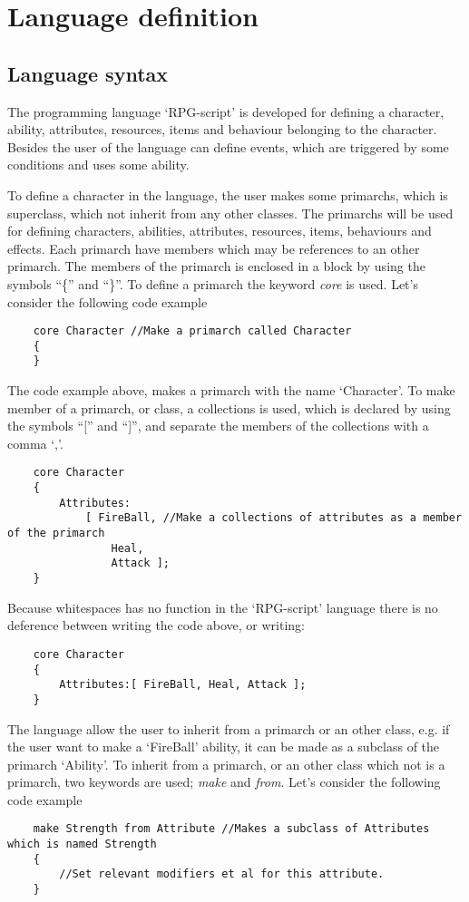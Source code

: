 \chapter{Language definition}
\section{Language syntax}

The programming language `RPG-script' is developed for defining a character, ability, attributes, resources, items and behaviour belonging to the character. Besides the user of the language can define events, which are triggered by some conditions and uses some ability.

To define a character in the language, the user makes some primarchs, which is superclass, which not inherit from any other classes. The primarchs will be used for defining characters, abilities, attributes, resources, items, behaviours and effects.
Each primarch have members which may be references to an other primarch. The members of the primarch is enclosed in a block by using the symbols ``\{'' and ``\}''. To define a primarch the keyword \emph{core} is used.
Let's consider the following code example 
\begin{lstlisting}
	core Character //Make a primarch called Character
	{
	}
\end{lstlisting}
The code example above, makes a primarch with the name `Character'. 
To make member of a primarch, or class, a collections is used, which is declared by using the symbols ``['' and ``]'', and separate the members of the collections with a comma `,'.
\begin{lstlisting}
	core Character
	{
		Attributes:
			[ FireBall, //Make a collections of attributes as a member of the primarch
				Heal,
				Attack ]; 
	}
\end{lstlisting}
Because whitespaces has no function in the `RPG-script' language there is no deference between writing the code above, or writing:
\begin{lstlisting}
	core Character
	{
		Attributes:[ FireBall, Heal, Attack ];
	}
\end{lstlisting}

The language allow the user to inherit from a primarch or an other class, e.g. if the user want to make a `FireBall' ability, it can be made as a subclass of the primarch `Ability'. To inherit from a primarch, or an other class which not is a primarch, two keywords are used; \emph{make} and \emph{from}.
Let's consider the following code example
\begin{lstlisting}
	make Strength from Attribute //Makes a subclass of Attributes which is named Strength
	{
		//Set relevant modifiers et al for this attribute.
	}
\end{lstlisting}

